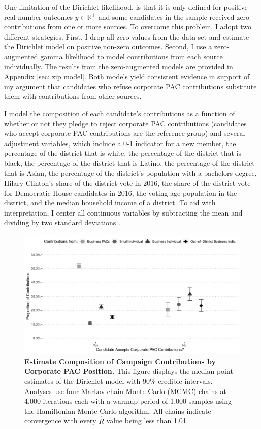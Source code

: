 \documentclass[12pt]{article}
\begin{document}
One limitation of the Dirichlet likelihood, is that it is only defined for positive real number outcomes $y \in  \mathbb{R}^+$ and some candidates in the sample received zero contributions from one or more sources. To overcome this problem, I adopt two different strategies. First, I drop all zero values from the data set and estimate the Dirichlet model on positive non-zero outcomes. Second, I use a zero-augmented gamma likelihood to model contributions from each source individually. The results from the zero-augmented models are provided in Appendix \ref{sec: zip model}. Both models yield consistent evidence in support of my argument that candidates who refuse corporate PAC contributions substitute them with contributions from other sources. 

I model the composition of each candidate's contributions as a function of whether or not they pledge to reject corporate PAC contributions (candidates who accept corporate PAC contributions are the reference group) and several adjustment variables, which include a 0-1 indicator for a new member, the percentage of the district that is white, the percentage of the district that is black, the percentage of the district that is Latino, the percentage of the district that is Asian, the percentage of the district's population with a bachelors degree, Hilary Clinton's share of the district vote in 2016, the share of the district vote for Democratic House candidates in 2016, the voting-age population in the district, and the median household income of a district. To aid with interpretation, I center all continuous variables by subtracting the mean and dividing by two standard deviations \citep{gelman2020}.

\begin{figure}[!htb]
    \centering
    \includegraphics[width=0.9\linewidth]{dir_model_results.pdf}
    \caption{\textbf{Estimate Composition of Campaign Contributions by Corporate PAC Position.} This figure displays the median point estimates of the Dirichlet model with 90\% credible intervals. Analyses use four Markov chain Monte Carlo (MCMC) chains at 4,000 iterations each with a warmup period of 1,000 samples using the Hamiltonian Monte Carlo algorithm. All chains indicate convergence with every $\hat{R}$ value being less than 1.01.}
    \label{fig: dir results}
\end{figure}
\end{document}
